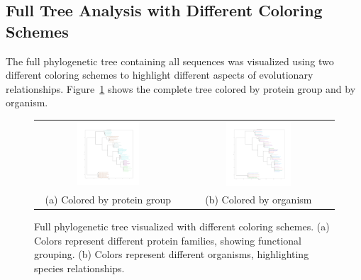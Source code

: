 \documentclass[11pt, a4paper, hidelinks]{article}
\begin{document}
\subsection{Full Tree Analysis with Different Coloring Schemes}\label{subsec:full-tree-analysis-with-different-coloring-schemes}

The full phylogenetic tree containing all sequences was visualized using two different coloring schemes to highlight different aspects of evolutionary relationships. Figure~\ref{fig:full_trees} shows the complete tree colored by protein group and by organism.

\begin{figure}[H]
    \centering
    \begin{tabular}{cc}
        \includegraphics[width=0.45\textwidth]{full_colored_by_group.png} &
        \includegraphics[width=0.45\textwidth]{full_colored.png} \\
        (a) Colored by protein group & (b) Colored by organism
    \end{tabular}
    \caption{Full phylogenetic tree visualized with different coloring schemes. (a) Colors represent different protein families, showing functional grouping. (b) Colors represent different organisms, highlighting species relationships.}
    \label{fig:full_trees}
\end{figure}
\end{document}

